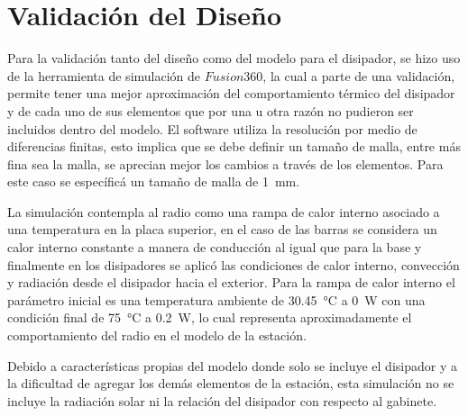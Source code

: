 \section{Validación del Diseño}

Para la validación tanto del diseño como del modelo para el disipador, se hizo uso de la herramienta de simulación de $Fusion 360$, la cual a parte de una validación, permite tener una mejor aproximación del comportamiento térmico del disipador y de cada uno de sus elementos que por una u otra razón no pudieron ser incluidos dentro del modelo. El software utiliza la resolución por medio de diferencias finitas, esto implica que se debe definir un tamaño de malla, entre más fina sea la malla, se aprecian mejor los cambios a través de los elementos. Para este caso se específicá un tamaño de malla de \SI{1}{\milli\meter}.

La simulación contempla al radio como una rampa de calor interno asociado a una temperatura en la placa superior, en el caso de las barras se considera un calor interno constante a manera de conducción al igual que para la base y finalmente en los disipadores se aplicó las condiciones de calor interno, convección y radiación desde el disipador hacia el exterior. Para la rampa de calor interno el parámetro inicial es una temperatura ambiente de \SI{30,45}{\celsius} a \SI{0}{\watt} con una condición final de \SI{75}{\celsius} a \SI{0,2}{\watt}, lo cual representa aproximadamente el comportamiento del radio en el modelo de la estación.

Debido a características propias del modelo donde solo se incluye el disipador y a la dificultad de agregar los demás elementos de la estación, esta simulación no se incluye la radiación solar ni la relación del disipador con respecto al gabinete.


